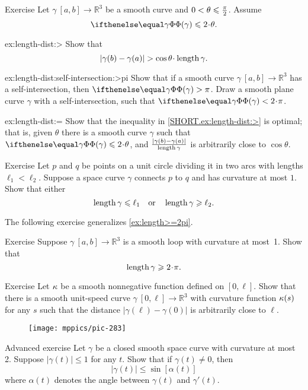 \begin{thm}{Exercise}\label{ex:length-dist}
Let $\gamma\:[a,b]\to \mathbb{R}^3$ be a smooth curve and $0\z<\theta\z\le\tfrac\pi2$.
Assume 
\[\tc\gamma\le 2\cdot\theta.\]

\begin{subthm}{ex:length-dist:>} Show that
\[|\gamma(b)-\gamma(a)|> \cos\theta\cdot\length\gamma.\]
\end{subthm}

\begin{subthm}{ex:length-dist:self-intersection:>pi}
Show that if a smooth curve $\gamma\:[a,b]\to\mathbb{R}^3$ has a self-intersection, then $\tc\gamma>\pi$.
Draw a smooth plane curve $\gamma$ with a self-intersection, such that $\tc\gamma<2\cdot\pi$.
\end{subthm}


\begin{subthm}{ex:length-dist:=} Show that the inequality in \ref{SHORT.ex:length-dist:>} is optimal; that is, given 
$\theta$ there is a smooth curve $\gamma$ such that $\tc\gamma\le 
2\cdot\theta$, and $\frac{|\gamma(b)-\gamma(a)|}{\mathop{\rm length}\nolimits\gamma}$ is arbitrarily 
close to $\cos\theta$.
\end{subthm}

\end{thm}

\begin{thm}{Exercise}\label{ex:schwartz}
Let $p$ and $q$ be points on a unit circle dividing it in two arcs with lengths $\ell_1<\ell_2$.
Suppose a space curve $\gamma$ connects $p$ to $q$ and has curvature at most $1$.
Show that either
\[\mathop{\rm length}\nolimits \gamma\leqslant \ell_1
\quad\text{or}\quad
\mathop{\rm length}\nolimits \gamma\geqslant \ell_2.
\]
\end{thm}

The following exercise generalizes \ref{ex:length>=2pi}.

\begin{thm}{Exercise}\label{ex:loop}
Suppose $\gamma\:[a,b]\to \mathbb{R}^3$ is a smooth loop with curvature at most~1.
Show that 
\[\length\gamma\ge2\cdot\pi.\]

\end{thm}

\begin{thm}{Exercise}\label{ex:bow-upper}
Let $\kappa$ be a smooth nonnegative function defined on $[0,\ell]$.
Show that there is a smooth unit-speed curve $\gamma\:[0,\ell]\to\mathbb{R}^3$ with curvature function $\kappa(s)$ for any $s$ such that the distance $|\gamma(\ell)-\gamma(0)|$ is arbitrarily close to $\ell$.
\end{thm}

\begin{wrapfigure}{r}{39 mm}
\vskip-4mm
\centering
\texttt{[image: mppics/pic-283]}
\vskip0mm
\end{wrapfigure}

\begin{thm}{Advanced exercise}\label{ex:gromov-twist}
Let $\gamma$ be a closed smooth space curve with curvature at most 2.
Suppose $|\gamma(t)|\le 1$ for any $t$.
Show that if $\gamma(t)\ne 0$, then 
\[|\gamma(t)| \le \sin [\alpha(t)]\]
where $\alpha(t)$ denotes the angle between  $\gamma(t)$ and $\gamma'(t)$.
\end{thm}

